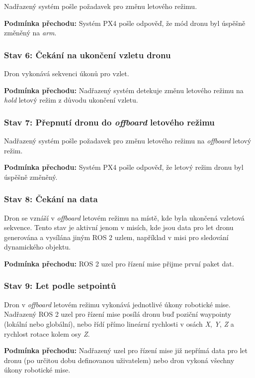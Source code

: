 Nadřazený systém pošle požadavek pro změnu letového režimu.

\noindent\textbf{Podmínka přechodu:} Systém PX4 pošle odpověď, že mód dronu byl úspěšně změněný na \textit{arm}.

\subsubsection{Stav 6: Čekání na ukončení vzletu dronu}

Dron vykonává sekvenci úkonů pro vzlet.

\noindent\textbf{Podmínka přechodu:} Nadřazený systém detekuje změnu letového režimu na \textit{hold} letový režim z důvodu ukončení vzletu.

\subsubsection{Stav 7: Přepnutí dronu do \textit{offboard} letového režimu}

Nadřazený systém pošle požadavek pro změnu letového režimu na \textit{offboard} letový režim.

\noindent\textbf{Podmínka přechodu:} Systém PX4 pošle odpověď, že letový režim dronu byl úspěšně změněný.

\subsubsection{Stav 8: Čekání na data}

Dron se vznáší v \textit{offboard} letovém režimu na místě, kde byla ukončená vzletová sekvence. Tento stav je aktivní jenom v misích, kde jsou data pro let dronu generována a vysílána jiným ROS 2 uzlem, například v misi pro sledování dynamického objektu.

\noindent\textbf{Podmínka přechodu:} ROS 2 uzel pro řízení mise přijme první paket dat.

\subsubsection{Stav 9: Let podle setpointů}

Dron v \textit{offboard} letovém režimu vykonává jednotlivé úkony robotické mise. Nadřazený ROS 2 uzel pro řízení mise posílá dronu buď poziční waypointy (lokální nebo globální), nebo řídí přímo lineární rychlosti v osách \textit{X}, \textit{Y}, \textit{Z} a rychlost rotace kolem osy \textit{Z}.

\noindent\textbf{Podmínka přechodu:} Nadřazený uzel pro řízení mise již nepřímá data pro let dronu (po určitou dobu definovanou uživatelem) nebo dron vykoná všechny úkony robotické mise.

